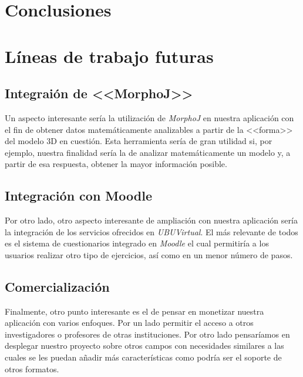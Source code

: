 
\section{Conclusiones}

\section{Líneas de trabajo futuras}

\subsection{Integraión de <<MorphoJ>>}
Un aspecto interesante sería la utilización de \textit{MorphoJ} en nuestra aplicación con el fin de obtener datos matemáticamente analizables a partir de la <<forma>> del modelo 3D en cuestión. Esta herramienta sería de gran utilidad si, por ejemplo, nuestra finalidad sería la de analizar matemáticamente un modelo y, a partir de esa respuesta, obtener la mayor información posible.

\subsection{Integración con Moodle}
Por otro lado, otro aspecto interesante de ampliación con nuestra aplicación sería la integración de los servicios ofrecidos en \textit{UBUVirtual}. El más relevante de todos es el sistema de cuestionarios integrado en \textit{Moodle} el cual permitiría a los usuarios realizar otro tipo de ejercicios, así como en un menor número de pasos.

\subsection{Comercialización}
Finalmente, otro punto interesante es el de pensar en monetizar nuestra aplicación con varios enfoques. Por un lado permitir el acceso a otros investigadores o profesores de otras instituciones.
Por otro lado pensaríamos en desplegar nuestro proyecto sobre otros campos con necesidades similares a las cuales se les puedan añadir más características como podría ser el soporte de otros formatos.